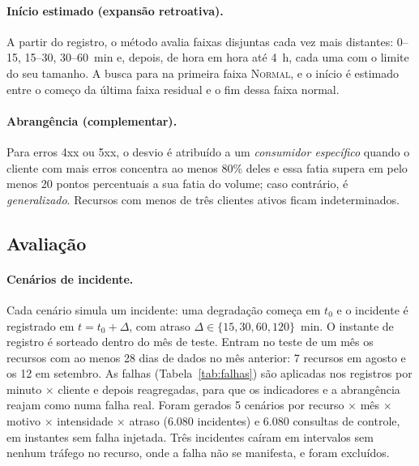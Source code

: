 \documentclass[sigconf,nonacm]{acmart}
\newcommand{\Normal}{\textsc{Normal}\xspace}
\begin{document}
\paragraph{Início estimado (expansão retroativa).} A partir do registro, o método avalia faixas disjuntas cada vez mais distantes: 0--15, 15--30, 30--60~min e, depois, de hora em hora até 4~h, cada uma com o limite do seu tamanho. A busca para na primeira faixa \Normal, e o início é estimado entre o começo da última faixa residual e o fim dessa faixa normal.

\paragraph{Abrangência (complementar).} Para erros 4xx ou 5xx, o desvio é atribuído a um \emph{consumidor específico} quando o cliente com mais erros concentra ao menos 80\% deles e essa fatia supera em pelo menos 20 pontos percentuais a sua fatia do volume; caso contrário, é \emph{generalizado}. Recursos com menos de três clientes ativos ficam indeterminados.

\subsection{Avaliação}

\paragraph{Cenários de incidente.} Cada cenário simula um incidente: uma degradação começa em $t_0$ e o incidente é registrado em $t=t_0+\Delta$, com atraso $\Delta\in\{15,30,60,120\}$~min. O instante de registro é sorteado dentro do mês de teste. Entram no teste de um mês os recursos com ao menos 28 dias de dados no mês anterior: 7 recursos em agosto e os 12 em setembro. As falhas (Tabela~\ref{tab:falhas}) são aplicadas nos registros por minuto $\times$ cliente e depois reagregadas, para que os indicadores e a abrangência reajam como numa falha real. Foram gerados 5 cenários por recurso $\times$ mês $\times$ motivo $\times$ intensidade $\times$ atraso (6.080 incidentes) e 6.080 consultas de controle, em instantes sem falha injetada. Três incidentes caíram em intervalos sem nenhum tráfego no recurso, onde a falha não se manifesta, e foram excluídos.
\end{document}
